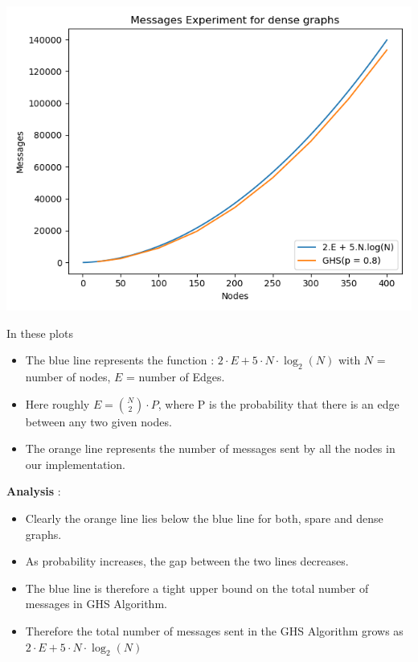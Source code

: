 \documentclass[letterpaper,11pt]{article}
\begin{document}
	\includegraphics[width = 0.7 \textwidth]{dense}
	
	\newpage 
	
	In these plots 
	\begin{itemize}
		\item The blue line represents the function : $2 \cdot E + 5 \cdot N \cdot \log_2(N)$ with $N$ = number of nodes, $E$ = number of Edges.
		\item Here roughly $E = {N \choose 2} \cdot P$, where P is the probability that there is an edge between any two given nodes.
		\item The orange line represents the number of messages sent by all the nodes in our implementation.
	\end{itemize} 

	{\bf Analysis } :
	\begin{itemize}
		\item Clearly the orange line lies below the blue line for both, spare and dense graphs.
		\item As probability increases, the gap between the two lines decreases. 
		\item The blue line is therefore a tight upper bound on the total number of messages in GHS Algorithm. 
		\item Therefore the total number of messages sent in the GHS Algorithm grows as $2 \cdot E + 5 \cdot N \cdot \log_2(N)$
	\end{itemize}
\end{document}
